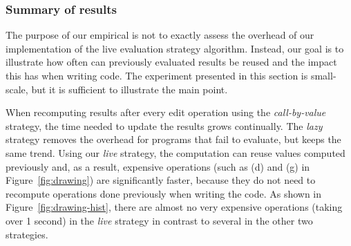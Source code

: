 \documentclass[acmsmall,anonymous,fleqn]{acmart}\settopmatter{printfolios=false,printccs=false,printacmref=false}
\theoremstyle{plain}
\theoremstyle{definition}
\begin{document}
\subsubsection{Summary of results}
The purpose of our empirical is not to exactly assess the overhead of our implementation
of the live evaluation strategy algorithm. Instead, our goal is to
illustrate how often can previously evaluated results be reused and the impact this has when
writing code. The experiment presented in this section is small-scale, but it is sufficient
to illustrate the main point.

When recomputing results after every edit operation
using the \emph{call-by-value} strategy, the time needed to update the results grows
continually. The \emph{lazy} strategy removes the overhead for programs that fail to evaluate, but
keeps the same trend. Using our \emph{live} strategy, the computation can reuse values computed
previously and, as a result, expensive operations (such as (d) and (g) in Figure~\ref{fig:drawing})
are significantly faster, because they do not need to recompute operations done previously when
writing the code. As shown in Figure~\ref{fig:drawing-hist}, there are almost no very expensive
operations (taking over 1 second) in the \emph{live} strategy in contrast to several in the
other two strategies.

\end{document}
